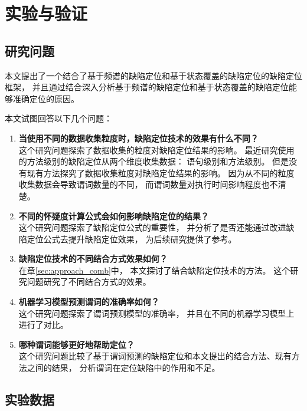 \chapter{实验与验证}

\section{研究问题}

本文提出了一个结合了基于频谱的缺陷定位和基于状态覆盖的缺陷定位的缺陷定位框架，
并且通过结合深入分析基于频谱的缺陷定位和基于状态覆盖的缺陷定位能够准确定位的原因。

本文试图回答以下几个问题：
\begin{enumerate}
\item \textbf{当使用不同的数据收集粒度时，缺陷定位技术的效果有什么不同？} \\
这个研究问题探索了数据收集的粒度对缺陷定位结果的影响。
最近研究使用的方法级别的缺陷定位从两个维度收集数据：
语句级别和方法级别。
但是没有现有方法探究了数据收集粒度对缺陷定位结果的影响。
因为从不同的粒度收集数据会导致谓词数量的不同，
而谓词数量对执行时间影响程度也不清楚。
\item \textbf{不同的怀疑度计算公式会如何影响缺陷定位的结果？} \\
这个研究问题探索了缺陷定位公式的重要性，
并分析了是否还能通过改进缺陷定位公式去提升缺陷定位效果，
为后续研究提供了参考。
\item \textbf{缺陷定位技术的不同结合方式效果如何？} \\
在章\ref{sec:approach_comb}中，
本文探讨了结合缺陷定位技术的方法。
这个研究问题研究了不同结合方式的效果。
\item \textbf{机器学习模型预测谓词的准确率如何？} \\
这个研究问题探索了谓词预测模型的准确率，
并且在不同的机器学习模型上进行了对比。
\item \textbf{哪种谓词能够更好地帮助定位？} \\
这个研究问题比较了基于谓词预测的缺陷定位和本文提出的结合方法、现有方法之间的结果，
分析谓词在定位缺陷中的作用和不足。

\end{enumerate}

\section{实验数据}

